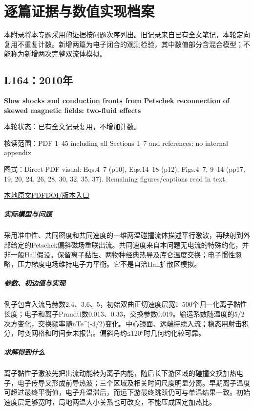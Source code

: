 \chapter{逐篇证据与数值实现档案}

本附录将本专题采用的证据按问题次序列出。旧记录来自已有全文笔记，本轮定向复用不重复计数。新增两篇为电子闭合的观测检验，其中数值部分含混合模型；不能称为新增两次完整双流体模拟。



\section{L164：2010年}\label{paper:L164}

\textbf{Slow shocks and conduction fronts from Petschek reconnection of skewed magnetic fields: two-fluid effects}\citep{L164}

\textsf{本轮状态：}已有全文记录复用，不增加计数。

\textsf{核读范围：}PDF 1–45 including all Sections 1–7 and references;  no internal appendix\par\textsf{图式：}Direct PDF visual: Eqs.4–7 (p10),  Eqs.14–18 (p12),  Figs.4–7, 9–14 (pp17, 19, 20, 24, 26, 28, 30, 32, 35, 37). Remaining figures/captions read in text.

\href{run:../../papers/L164.pdf}{本地原文PDF}\quad\href{https://doi.org/10.1088/0004-637X/718/2/1491}{DOI/版本入口}

\paragraph{实际模型与问题}采用准中性、共同密度和共同速度的一维两温碰撞流体描述平行激波，再映射到外部给定的Petschek偏斜磁场重联出流。共同速度来自本问题无电流的特殊约化，并非一般Hall假设。保留离子黏性、两物种经典热导及库仑温度交换；电子惯性忽略，压力梯度电场维持电子力平衡。它不是自洽Hall扩散区模拟。

\paragraph{参数、初边值与实现}例子包含入流马赫数2.4、3.6、5，初始双曲正切速度层宽1–500个归一化离子黏性长度；电子和离子Prandtl数0.013、0.33，交换参数0.019。输运系数随温度的5/2次方变化，交换频率随nTe\textasciicircum{}(-3/2)变化。中心镜面、远端持续入流；稳态用射击积分，时变网格和时间步未报告。偏斜角约≤120°时几何约化较可靠。

\paragraph{求解得到什么}离子黏性子激波先把出流动能转为离子内能，随后长下游区域的碰撞交换加热电子，电子传导又形成前导热波；三个区域及相关时间尺度明显分离。早期离子温度可超过最终平衡值，电子升温滞后，而远下游最终跳跃仍可与单温结果一致。初始速度层足够宽时，局地两温大小关系也可改变，不能压成固定加热比。

